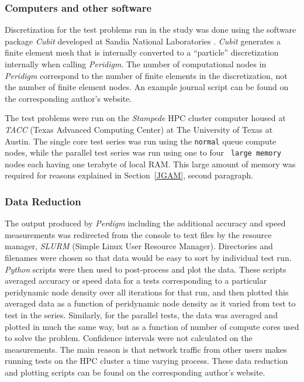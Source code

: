 \documentclass[preprint,12pt]{elsarticle}
\begin{document}
\subsubsection{Computers and other software} 
%
Discretization for the test problems run in the study was done using the
software package \emph{Cubit} developed at Sandia National Laboratories
\cite{ref-Cubit}. \emph{Cubit} generates a finite element mesh that is
internally converted to a ``particle'' discretization internally when calling
\emph{Peridigm}. The number of computational nodes in \emph{Peridigm}
correspond to the number of finite elements in the discretization, not the
number of finite element nodes.  An example journal script can be found on the
corresponding author's website. 

The test problems were run on the \emph{Stampede} HPC cluster computer housed
at \emph{TACC} (Texas Advanced Computing Center) at The University of Texas at
Austin. The single core test series was run using the {\tt normal} queue
compute nodes, while the parallel test series was run using one to four {\tt
large memory} nodes each having one terabyte of local RAM. This large amount of
memory was required for reasons explained in Section~\ref{JGAM}, second paragraph.  

\subsubsection{Data Reduction} 

The output produced by \emph{Perdigm} including the additional accuracy and
speed measurements was redirected from the console to text files by the
resource manager, \emph{SLURM} (Simple Linux User Resource Manager).
Directories and filenames were chosen so that data would be easy to sort by
individual test run.  \emph{Python} scripts were then used to post-process and
plot the data. These scripts averaged accuracy or speed data for a tests
corresponding to a particular peridynamic node density over all iterations for
that run, and then plotted this averaged data  as a function of peridynamic
node density as it varied from test to test in the series.  Similarly, for the
parallel tests, the data was averaged and plotted in much the same way, but as
a function of number of compute cores used to solve the problem. Confidence
intervals were not calculated on the measurements. The main reason is that
network traffic from other users makes running tests on the HPC cluster a time
varying process. These data reduction and plotting scripts can be found on the
corresponding author's website.
\end{document}
